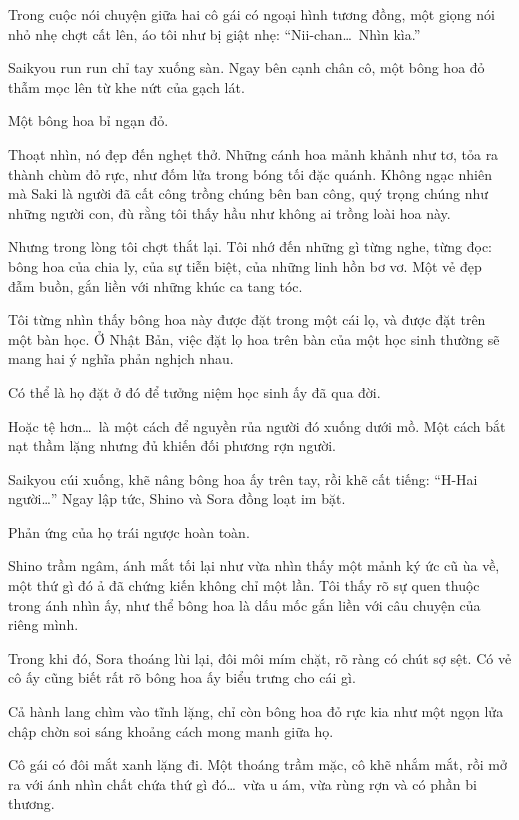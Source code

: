 \documentclass[../main.tex]{subfiles}
\begin{document}
Trong cuộc nói chuyện giữa hai cô gái có ngoại hình tương đồng, một giọng nói nhỏ nhẹ chợt cất lên, áo tôi như bị giật nhẹ: ``Nii-chan\dots\ Nhìn kìa.''

Saikyou run run chỉ tay xuống sàn. Ngay bên cạnh chân cô, một bông hoa đỏ thẫm mọc lên từ khe nứt của gạch lát.

Một bông hoa bỉ ngạn đỏ.


Thoạt nhìn, nó đẹp đến nghẹt thở. Những cánh hoa mảnh khảnh như tơ, tỏa ra thành chùm đỏ rực, như đốm lửa trong bóng tối đặc quánh. Không ngạc nhiên mà Saki là người đã cất công trồng chúng bên ban công, quý trọng chúng như những người con, đù rằng tôi thấy hầu như không ai trồng loài hoa này.

Nhưng trong lòng tôi chợt thắt lại. Tôi nhớ đến những gì từng nghe, từng đọc: bông hoa của chia ly, của sự tiễn biệt, của những linh hồn bơ vơ. Một vẻ đẹp đẫm buồn, gắn liền với những khúc ca tang tóc.

Tôi từng nhìn thấy bông hoa này được đặt trong một cái lọ, và được đặt trên một bàn học. Ở Nhật Bản, việc đặt lọ hoa trên bàn của một học sinh thường sẽ mang hai ý nghĩa phản nghịch nhau.

Có thể là họ đặt ở đó để tưởng niệm học sinh ấy đã qua đời.

Hoặc tệ hơn\dots\ là một cách để nguyền rủa người đó xuống dưới mồ. Một cách bắt nạt thầm lặng nhưng đủ khiến đối phương rợn người.

Saikyou cúi xuống, khẽ nâng bông hoa ấy trên tay, rồi khẽ cất tiếng: ``H-Hai người\dots'' Ngay lập tức, Shino và Sora đồng loạt im bặt.

Phản ứng của họ trái ngược hoàn toàn.

Shino trầm ngâm, ánh mắt tối lại như vừa nhìn thấy một mảnh ký ức cũ ùa về, một thứ gì đó ả đã chứng kiến không chỉ một lần. Tôi thấy rõ sự quen thuộc trong ánh nhìn ấy, như thể bông hoa là dấu mốc gắn liền với câu chuyện của riêng mình.

Trong khi đó, Sora thoáng lùi lại, đôi môi mím chặt, rõ ràng có chút sợ sệt. Có vẻ cô ấy cũng biết rất rõ bông hoa ấy biểu trưng cho cái gì.

Cả hành lang chìm vào tĩnh lặng, chỉ còn bông hoa đỏ rực kia như một ngọn lửa chập chờn soi sáng khoảng cách mong manh giữa họ.

Cô gái có đôi mắt xanh lặng đi. Một thoáng trầm mặc, cô khẽ nhắm mắt, rồi mở ra với ánh nhìn chất chứa thứ gì đó\dots\ vừa u ám, vừa rùng rợn và có phần bi thương.
\end{document}
